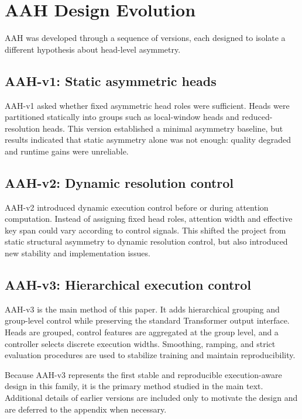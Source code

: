\documentclass[11pt]{article}
\begin{document}
\section{AAH Design Evolution}

AAH was developed through a sequence of versions, each designed to isolate a different hypothesis about head-level asymmetry.

\subsection{AAH-v1: Static asymmetric heads}

AAH-v1 asked whether fixed asymmetric head roles were sufficient. Heads were partitioned statically into groups such as local-window heads and reduced-resolution heads. This version established a minimal asymmetry baseline, but results indicated that static asymmetry alone was not enough: quality degraded and runtime gains were unreliable.

\subsection{AAH-v2: Dynamic resolution control}

AAH-v2 introduced dynamic execution control before or during attention computation. Instead of assigning fixed head roles, attention width and effective key span could vary according to control signals. This shifted the project from static structural asymmetry to dynamic resolution control, but also introduced new stability and implementation issues.

\subsection{AAH-v3: Hierarchical execution control}

AAH-v3 is the main method of this paper. It adds hierarchical grouping and group-level control while preserving the standard Transformer output interface. Heads are grouped, control features are aggregated at the group level, and a controller selects discrete execution widths. Smoothing, ramping, and strict evaluation procedures are used to stabilize training and maintain reproducibility.

Because AAH-v3 represents the first stable and reproducible execution-aware design in this family, it is the primary method studied in the main text. Additional details of earlier versions are included only to motivate the design and are deferred to the appendix when necessary.
\end{document}
